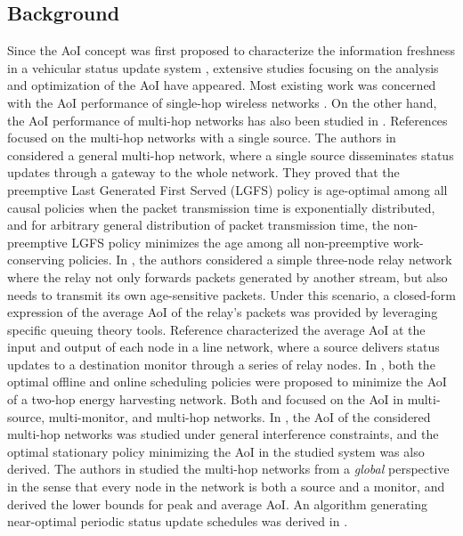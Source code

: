 \documentclass{IEEEtran}
\begin{document}
\subsection{Background}
Since the AoI concept was first proposed to characterize the information freshness in a vehicular status update system \cite{b1}, extensive studies focusing on the analysis and optimization of the AoI have appeared. Most existing work was concerned with the AoI performance of single-hop wireless networks \cite{b15, b16, b17, b18, b20, b21, b2, b19, b22, b23,b24,b25,b26,b27,b28,b29,b31, b30,b32,b33}. On the other hand,
the AoI performance of multi-hop networks has also been studied in \cite{ b34,b35, b36,  b37, b38,b39}. References \cite{ b34,b35, b36,  b37} focused on the multi-hop networks with a single source. The authors in \cite{b34} considered a general multi-hop network, where a single source disseminates status updates through a gateway to the whole network. They proved that the preemptive Last Generated First Served (LGFS) policy is age-optimal among all causal policies when the packet transmission time is exponentially distributed, and for arbitrary general distribution of packet transmission time, the non-preemptive LGFS policy minimizes the age among all non-preemptive work-conserving policies. In \cite{b35}, the authors considered a simple three-node relay network where the relay
not only forwards packets generated by another stream, but also needs to transmit its own age-sensitive packets.
Under this scenario, a closed-form expression of the average AoI of the relay's packets was provided by leveraging specific queuing theory tools. Reference \cite{b36} characterized the average AoI at the input and output of each node in a line network, where a source delivers status updates to a destination monitor through a series of relay nodes. In \cite{b37}, both the optimal offline and online scheduling policies were proposed to minimize the AoI of a two-hop energy harvesting network. Both \cite{b38} and \cite{b39} focused on the AoI in multi-source, multi-monitor, and multi-hop networks. In \cite{b38}, the AoI of the considered multi-hop networks was studied under general interference constraints, and the optimal stationary policy minimizing the AoI in the studied system was also derived. The authors in \cite{b39} studied the multi-hop networks from a \textit{global} perspective in the sense that every node in the network is both a source and a monitor, and derived the lower bounds for peak and average AoI. An algorithm generating near-optimal periodic status update schedules was derived in \cite{b39}.
\end{document}
